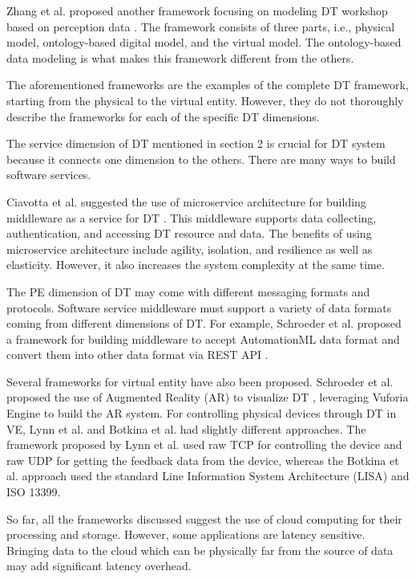 \documentclass[article,table]{aaltoseries}
\begin{document}
Zhang et al. proposed another framework focusing on modeling DT workshop based on perception data \cite{Zhang2017}. The framework consists of three parts, i.e., physical model, ontology-based digital model, and the virtual model. The ontology-based data modeling is what makes this framework different from the others.

The aforementioned frameworks are the examples of the complete DT framework, starting from the physical to the virtual entity. However, they do not thoroughly describe the frameworks for each of the specific DT dimensions.

The service dimension of DT mentioned in section 2 is crucial for DT system because it connects one dimension to the others. There are many ways to build software services.

Ciavotta et al. suggested the use of microservice architecture for building middleware as a service for DT \cite{ciavotta2017microservice}. This middleware supports data collecting, authentication, and accessing DT resource and data. The benefits of using microservice architecture include agility, isolation, and resilience as well as elasticity. However, it also increases the system complexity at the same time.

The PE dimension of DT may come with different messaging formats and protocols. Software service middleware must support a variety of data formats coming from different dimensions of DT. For example, Schroeder et al. proposed a framework for building middleware to accept AutomationML data format and convert them into other data format via REST API \cite{Schroeder2016automationml}.

Several frameworks for virtual entity have also been proposed. Schroeder et al. proposed the use of Augmented Reality (AR) to visualize DT \cite{schroeder2016visualising}, leveraging Vuforia Engine to build the AR system. For controlling physical devices through DT in VE, Lynn et al. \cite{lynn2018realization} and Botkina et al. \cite{botkina2018digital} had slightly different approaches. The framework proposed by Lynn et al. used raw TCP for controlling the device and raw UDP for getting the feedback data from the device, whereas the Botkina et al. approach used the standard Line Information System Architecture (LISA) and ISO 13399.

So far, all the frameworks discussed suggest the use of cloud computing for their processing and storage. However, some applications are latency sensitive. Bringing data to the cloud which can be physically far from the source of data may add significant latency overhead.
\end{document}
